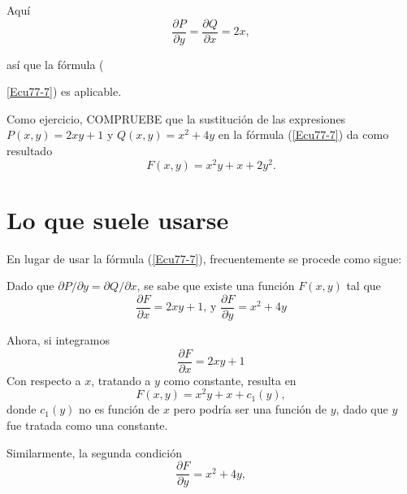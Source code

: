 \documentclass[12pt]{article}
\begin{document}
{%

Aqu\'{i}
\begin{equation}
 \frac{\partial P}{\partial y}=
\frac{\partial Q}{\partial x}=2x,
\end{equation}


as\'{i} que la f\'{o}rmula 
({\ref{Ecu77-7}) es aplicable.


Como ejercicio, COMPRUEBE que la sustituci\'{o}n de las expresiones $P(x,y)=2xy+1$ y $Q(x,y)=x^{2}+4y$ en la f\'{o}rmula (\ref{Ecu77-7}) da como resultado
\begin{equation}
 F(x,y)=x^{2}y+x+2y^{2}.
\end{equation}


\section*{Lo que suele usarse}
En lugar de usar la f\'{o}rmula (\ref{Ecu77-7}), frecuentemente se procede como sigue:



Dado que $\partial P/\partial y=\partial Q/\partial x$, se sabe que existe una funci\'{o}n $F(x,y)$ tal que
\begin{equation}
 \frac{\partial F}{\partial x}=2xy+1
\mbox{,\ \ \ y\ \ }
\frac{\partial F}{\partial y}=x^{2}+4y
\end{equation}



Ahora, si integramos
\begin{equation}
 \frac{\partial F}{\partial x}=2xy+1
\end{equation}
Con respecto a $x$, tratando a $y$ como constante, resulta en
\begin{equation}
 F(x,y)=x^{2}y+x+c_{1}(y),
\end{equation}
donde $c_{1}(y)$ no es funci\'{o}n de $x$ pero podr\'{i}a ser una funci\'{o}n de $y$, dado que $y$ fue tratada como una constante.





Similarmente, la segunda condici\'{o}n
\begin{equation}
 \frac{\partial F}{\partial y}=x^{2}+4y,
\end{equation}


}}
\end{document}
